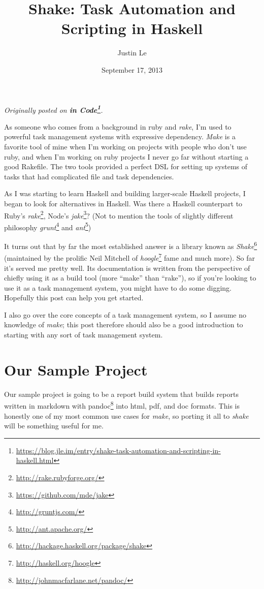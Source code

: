 \documentclass[]{article}
\title{Shake: Task Automation and Scripting in Haskell}
\author{Justin Le}
\date{September 17, 2013}
\renewcommand{\href}[2]{#2\footnote{\url{#1}}}
\begin{document}
\maketitle

\emph{Originally posted on
\textbf{\href{https://blog.jle.im/entry/shake-task-automation-and-scripting-in-haskell.html}{in
Code}}.}

As someone who comes from a background in ruby and \emph{rake}, I'm used to
powerful task management systems with expressive dependency. \emph{Make} is a
favorite tool of mine when I'm working on projects with people who don't use
ruby, and when I'm working on ruby projects I never go far without starting a
good Rakefile. The two tools provided a perfect DSL for setting up systems of
tasks that had complicated file and task dependencies.

As I was starting to learn Haskell and building larger-scale Haskell projects, I
began to look for alternatives in Haskell. Was there a Haskell counterpart to
Ruby's \href{http://rake.rubyforge.org/}{\emph{rake}}, Node's
\href{https://github.com/mde/jake}{\emph{jake}}? (Not to mention the tools of
slightly different philosophy \href{http://gruntjs.com/}{\emph{grunt}} and
\href{http://ant.apache.org/}{\emph{ant}})

It turns out that by far the most established answer is a library known as
\href{http://hackage.haskell.org/package/shake}{\emph{Shake}} (maintained by the
prolific Neil Mitchell of \href{http://haskell.org/hoogle}{\emph{hoogle}} fame
and much more). So far it's served me pretty well. Its documentation is written
from the perspective of chiefly using it as a build tool (more ``make'' than
``rake''), so if you're looking to use it as a task management system, you might
have to do some digging. Hopefully this post can help you get started.

I also go over the core concepts of a task management system, so I assume no
knowledge of \emph{make}; this post therefore should also be a good introduction
to starting with any sort of task management system.

\hypertarget{our-sample-project}{%
\section{Our Sample Project}\label{our-sample-project}}

Our sample project is going to be a report build system that builds reports
written in markdown with \href{http://johnmacfarlane.net/pandoc/}{pandoc} into
html, pdf, and doc formats. This is honestly one of my most common use cases for
\emph{make}, so porting it all to \emph{shake} will be something useful for me.
\end{document}

